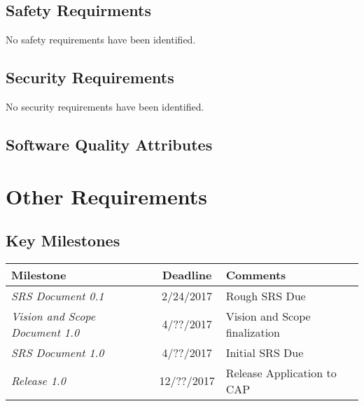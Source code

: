 \documentclass[12pt, letterpaper]{article}
\begin{document}
  \subsection{Safety Requirments}
  No safety requirements have been identified.
  \subsection{Security Requirements}
  No security requirements have been identified.
  \subsection{Software Quality Attributes}

\section{Other Requirements}
  \subsection{Key Milestones}
  \begin{tabularx}{\textwidth}{l c l}
    \hline
    \textbf{Milestone} & \textbf{Deadline} & \textbf{Comments}\\
    \hline
    \textit{SRS Document 0.1} & 2/24/2017 & Rough SRS Due \\
    \textit{Vision and Scope Document 1.0} & 4/??/2017 & Vision and Scope finalization \\
    \textit{SRS Document 1.0} & 4/??/2017 & Initial SRS Due \\
    \textit{Release 1.0} & 12/??/2017 & Release Application to CAP \\
    \hline
  \end{tabularx}
\appendix
\end{document}
